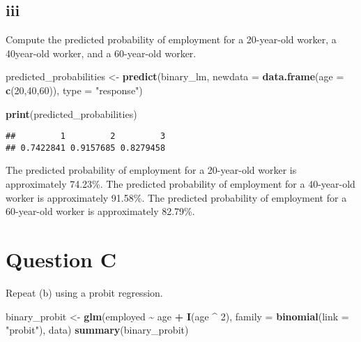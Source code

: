 \documentclass[
]{article}
\newenvironment{Shaded}{\begin{snugshade}}{\end{snugshade}}
\newcommand{\AttributeTok}[1]{\textcolor[rgb]{0.13,0.29,0.53}{#1}}
\newcommand{\DecValTok}[1]{\textcolor[rgb]{0.00,0.00,0.81}{#1}}
\newcommand{\FunctionTok}[1]{\textcolor[rgb]{0.13,0.29,0.53}{\textbf{#1}}}
\newcommand{\NormalTok}[1]{#1}
\newcommand{\OtherTok}[1]{\textcolor[rgb]{0.56,0.35,0.01}{#1}}
\newcommand{\SpecialCharTok}[1]{\textcolor[rgb]{0.81,0.36,0.00}{\textbf{#1}}}
\newcommand{\StringTok}[1]{\textcolor[rgb]{0.31,0.60,0.02}{#1}}
\begin{document}
\hypertarget{iii}{%
\subsection{iii}\label{iii}}

Compute the predicted probability of employment for a 20-year-old
worker, a 40year-old worker, and a 60-year-old worker.

\begin{Shaded}
\begin{Highlighting}[]
\NormalTok{predicted\_probabilities }\OtherTok{\textless{}{-}} \FunctionTok{predict}\NormalTok{(binary\_lm, }
                                   \AttributeTok{newdata =} \FunctionTok{data.frame}\NormalTok{(}\AttributeTok{age =} \FunctionTok{c}\NormalTok{(}\DecValTok{20}\NormalTok{,}\DecValTok{40}\NormalTok{,}\DecValTok{60}\NormalTok{)), }
                                   \AttributeTok{type =} \StringTok{"response"}\NormalTok{)}

\FunctionTok{print}\NormalTok{(predicted\_probabilities)}
\end{Highlighting}
\end{Shaded}

\begin{verbatim}
##         1         2         3 
## 0.7422841 0.9157685 0.8279458
\end{verbatim}

The predicted probability of employment for a 20-year-old worker is
approximately 74.23\%. The predicted probability of employment for a
40-year-old worker is approximately 91.58\%. The predicted probability
of employment for a 60-year-old worker is approximately 82.79\%.

\hypertarget{question-c}{%
\section{Question C}\label{question-c}}

Repeat (b) using a probit regression.

\begin{Shaded}
\begin{Highlighting}[]
\NormalTok{binary\_probit }\OtherTok{\textless{}{-}} \FunctionTok{glm}\NormalTok{(employed }\SpecialCharTok{\textasciitilde{}}\NormalTok{ age }\SpecialCharTok{+} \FunctionTok{I}\NormalTok{(age }\SpecialCharTok{\^{}} \DecValTok{2}\NormalTok{), }
                     \AttributeTok{family =} \FunctionTok{binomial}\NormalTok{(}\AttributeTok{link =} \StringTok{"probit"}\NormalTok{), }
\NormalTok{                     data)}
\FunctionTok{summary}\NormalTok{(binary\_probit)}
\end{Highlighting}
\end{Shaded}
\end{document}
